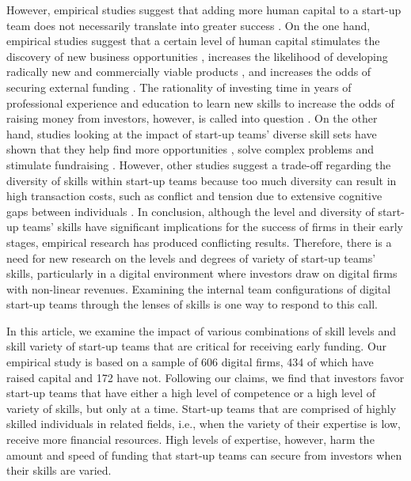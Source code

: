 \documentclass[12pt]{article}
\begin{document}
However, empirical studies suggest that adding more human capital to a start-up team does not necessarily translate into greater success \citep{pierce2013too}. On the one hand, empirical studies suggest that a certain level of human capital stimulates the discovery of new business opportunities \citep{shane2000promise, marvel2016human}, increases the likelihood of developing radically new and commercially viable products \citep{marvel2007technology}, and increases the odds of securing external funding \citep{beckman2007early}. The rationality of investing time in years of professional experience and education to learn new skills to increase the odds of raising money from investors, however, is called into question \citep{audretsch2004financing}. On the other hand, studies looking at the impact of start-up teams' diverse skill sets have shown that they help find more opportunities \citep{shane2000prior}, solve complex problems \citep{hong2001problem} and stimulate fundraising \citep{ko2018signaling}. However, other studies suggest a trade-off regarding the diversity of skills within start-up teams because too much diversity can result in high transaction costs, such as conflict and tension due to extensive cognitive gaps between individuals \citep{nooteboom2007optimal}. In conclusion, although the level and diversity of start-up teams' skills have significant implications for the success of firms in their early stages, empirical research has produced conflicting results. Therefore, there is a need for new research on the levels and degrees of variety of start-up teams' skills, particularly in a digital environment where investors draw on digital firms with non-linear revenues. Examining the internal team configurations of digital start-up teams through the lenses of skills is one way to respond to this call.

In this article, we examine the impact of various combinations of skill levels and skill variety of start-up teams that are critical for receiving early funding. Our empirical study is based on a sample of 606 digital firms, 434 of which have raised capital and 172 have not. Following our claims, we find that investors favor start-up teams that have either a high level of competence or a high level of variety of skills, but only at a time. Start-up teams that are comprised of highly skilled individuals in related fields, i.e., when the variety of their expertise is low, receive more financial resources. High levels of expertise, however, harm the amount and speed of funding that start-up teams can secure from investors when their skills are varied.
\end{document}
